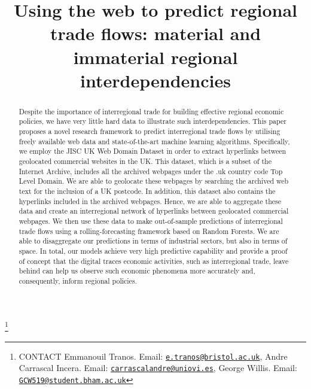 \documentclass[]{interact}
\theoremstyle{plain}%
\theoremstyle{definition}
\theoremstyle{remark}
\begin{document}
\articletype{}

\title{Using the web to predict regional trade flows: material and
immaterial regional interdependencies}


\author{
}

\thanks{CONTACT Emmanouil
Tranos. Email: \href{mailto:e.tranos@bristol.ac.uk}{\nolinkurl{e.tranos@bristol.ac.uk}}, Andre
Carrascal
Incera. Email: \href{mailto:carrascalandre@uniovi.es}{\nolinkurl{carrascalandre@uniovi.es}}, George
Willis. Email: \href{mailto:GCW519@student.bham.ac.uk}{\nolinkurl{GCW519@student.bham.ac.uk}}}

\maketitle

\begin{abstract}
Despite the importance of interregional trade for building effective
regional economic policies, we have very little hard data to illustrate
such interdependencies. This paper proposes a novel research framework
to predict interregional trade flows by utilising freely available web
data and state-of-the-art machine learning algorithms. Specifically, we
employ the JISC UK Web Domain Dataset in order to extract hyperlinks
between geolocated commercial websites in the UK. This dataset, which is
a subset of the Internet Archive, includes all the archived webpages
under the .uk country code Top Level Domain. We are able to geolocate
these webpages by searching the archived web text for the inclusion of a
UK postcode. In addition, this dataset also contains the hyperlinks
included in the archived webpages. Hence, we are able to aggregate these
data and create an interregional network of hyperlinks between
geolocated commercial webpages. We then use these data to make
out-of-sample predictions of interregional trade flows using a
rolling-forecasting framework based on Random Forests. We are able to
disaggregate our predictions in terms of industrial sectors, but also in
terms of space. In total, our models achieve very high predictive
capability and provide a proof of concept that the digital traces
economic activities, such as interregional trade, leave behind can help
us observe such economic phenomena more accurately and, consequently,
inform regional policies.
\end{abstract}
\end{document}

